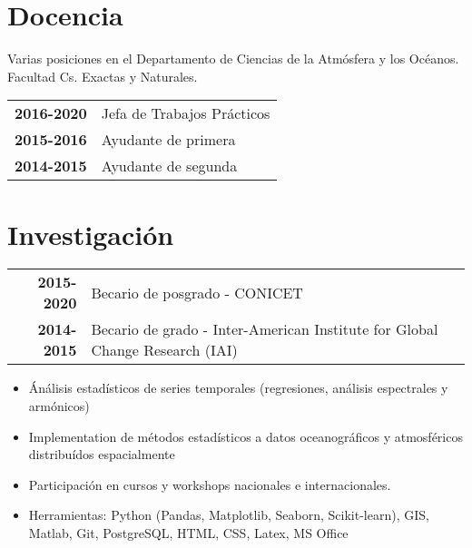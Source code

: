 \documentclass[pastel]{hipstercv}
\begin{document}
\begin{paracol}{2}
\begin{tabular}{>{\footnotesize\bfseries}r >{\footnotesize}p{}}
\end{tabular}
    
\section*{Docencia}
Varias posiciones en el Departamento de Ciencias de la Atm\'osfera y los Oc\'eanos. Facultad Cs. Exactas y Naturales.\\

\begin{tabular}{>{\footnotesize\bfseries}r >{\footnotesize}p{}}
    2016-2020 & Jefa de Trabajos Pr\'acticos\\
    2015-2016 & Ayudante de primera\\
    2014-2015 & Ayudante de segunda
\end{tabular}

\section*{Investigación}
\begin{tabular}{>{\footnotesize\bfseries}r >{\footnotesize}p{}}
    2015-2020 & Becario de posgrado - CONICET\\
    2014-2015 & Becario de grado - Inter-American Institute for Global Change Research (IAI)\\
\end{tabular}
\footnotesize
\renewcommand\labelitemi{\tiny$\bullet$}
    \begin{itemize}
        \item Ánálisis estadísticos de series temporales (regresiones, análisis espectrales y armónicos)
        \item Implementation de métodos estadísticos a datos oceanográficos y atmosféricos distribuídos espacialmente
        \item Participación en cursos y workshops nacionales e internacionales.
        \item Herramientas: Python (Pandas, Matplotlib, Seaborn, Scikit-learn), GIS, Matlab, Git, PostgreSQL, HTML, CSS, Latex, MS Office
    \end{itemize}




\end{paracol}
\end{document}
